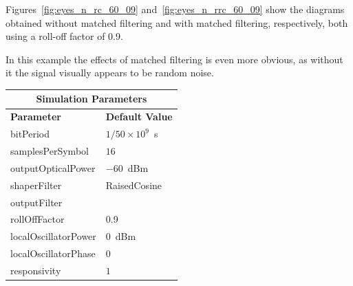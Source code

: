 \begin{refsection}
Figures~\ref{fig:eyes_n_rc_60_09} and~\ref{fig:eyes_n_rrc_60_09} show the
diagrams obtained without matched filtering and with matched filtering,
respectively, both using a roll-off factor of 0.9.

In this example the effects of matched filtering is even more obvious, as
without it the signal visually appears to be random noise.
\begin{table}[H]
	\centering
	\footnotesize
	\begin{tabular}{|l|l|}
		\hline
		\multicolumn{2}{|c|}{ \textbf{Simulation Parameters} } \\
		\hline
		\textbf{Parameter}     & \textbf{Default Value}                                     \\\hline
		bitPeriod              & $1/50\times10^9$~s														\\\hline
		samplesPerSymbol       & $16$                                                       \\\hline
		outputOpticalPower     & $-60$~dBm 													\\ \hline
		shaperFilter	       & RaisedCosine												\\ \hline
		outputFilter		   &                												\\ \hline
		rollOffFactor		   & 0.9														\\ \hline
		localOscillatorPower   & $0$~dBm                                                    \\ \hline
		localOscillatorPhase   & $0$                                                        \\ \hline
		responsivity           & $1$                                                        \\ \hline

\end{tabular}
\end{table}
\end{refsection}

